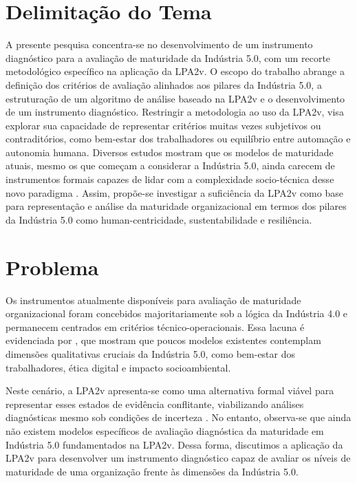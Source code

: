  


\section{Delimitação do Tema}

A presente pesquisa concentra-se no desenvolvimento de um instrumento diagnóstico para a avaliação de maturidade da Indústria 5.0, com um recorte metodológico específico na aplicação da \gls{LPA2v}.
O escopo do trabalho abrange a definição dos critérios de avaliação alinhados aos pilares da Indústria 5.0, a estruturação de um algoritmo de análise baseado na \gls{LPA2v} e o desenvolvimento de um instrumento diagnóstico.
Restringir a metodologia ao uso da \gls{LPA2v}, visa explorar sua capacidade de representar critérios muitas vezes subjetivos ou contraditórios, como bem-estar dos trabalhadores ou equilíbrio entre automação e autonomia humana.
Diversos estudos mostram que os modelos de maturidade atuais, mesmo os que começam a considerar a Indústria 5.0, ainda carecem de instrumentos formais capazes de lidar com a complexidade socio-técnica desse novo paradigma \cite{BARO2025, HeinPensel2023}.
Assim, propõe-se investigar a suficiência da \gls{LPA2v} como base para representação e análise da maturidade organizacional em termos dos pilares da Indústria 5.0 como human-centricidade, sustentabilidade e resiliência.

\section{Problema}

Os instrumentos atualmente disponíveis para avaliação de maturidade organizacional foram concebidos majoritariamente sob a lógica da Indústria 4.0 e permanecem centrados em critérios técnico-operacionais.
Essa lacuna é evidenciada por , que mostram que poucos modelos existentes contemplam dimensões qualitativas cruciais da Indústria 5.0, como bem-estar dos trabalhadores, ética digital e impacto socioambiental.

Neste cenário, a \gls{LPA2v} apresenta-se como uma alternativa formal viável para representar esses estados de evidência conflitante, viabilizando análises diagnósticas mesmo sob condições de incerteza \cite{JoseSilvaFilho2006, CarvalhoBrunsteinAbe2003, CarvalhoJunior2024}.
No entanto, observa-se que ainda não existem modelos específicos de avaliação diagnóstica da maturidade em Indústria 5.0 fundamentados na \gls{LPA2v}.
Dessa forma, discutimos a aplicação da \gls{LPA2v} para desenvolver um instrumento diagnóstico capaz de avaliar os níveis de maturidade de uma organização frente às dimensões da Indústria 5.0.

